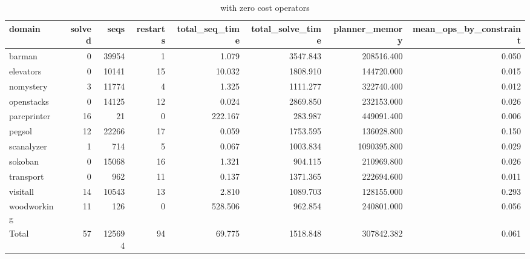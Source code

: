 \begin{table*}[ht]
\centering
\begin{tabular}{lrrrrrrr}
  \hline
domain & solved & seqs & restarts & total\_seq\_time & total\_solve\_time & planner\_memory & mean\_ops\_by\_constraint \\ 
  \hline
barman &    0 & 39954 &    1 & 1.079 & 3547.843 & 208516.400 & 0.050 \\ 
  elevators &    0 & 10141 &   15 & 10.032 & 1808.910 & 144720.000 & 0.015 \\ 
  nomystery &    3 & 11774 &    4 & 1.325 & 1111.277 & 322740.400 & 0.012 \\ 
  openstacks &    0 & 14125 &   12 & 0.024 & 2869.850 & 232153.000 & 0.026 \\ 
  parcprinter &   16 &   21 &    0 & 222.167 & 283.987 & 449091.400 & 0.006 \\ 
  pegsol &   12 & 22266 &   17 & 0.059 & 1753.595 & 136028.800 & 0.150 \\ 
  scanalyzer &    1 &  714 &    5 & 0.067 & 1003.834 & 1090395.800 & 0.029 \\ 
  sokoban &    0 & 15068 &   16 & 1.321 & 904.115 & 210969.800 & 0.026 \\ 
  transport &    0 &  962 &   11 & 0.137 & 1371.365 & 222694.600 & 0.011 \\ 
  visitall &   14 & 10543 &   13 & 2.810 & 1089.703 & 128155.000 & 0.293 \\ 
  woodworking &   11 &  126 &    0 & 528.506 & 962.854 & 240801.000 & 0.056 \\ 
  Total &   57 & 125694 &   94 & 69.775 & 1518.848 & 307842.382 & 0.061 \\ 
   \hline
\end{tabular}
\caption{\oursolver{} with zero cost operators} 
\label{tab:our_with_zero}
\end{table*}
